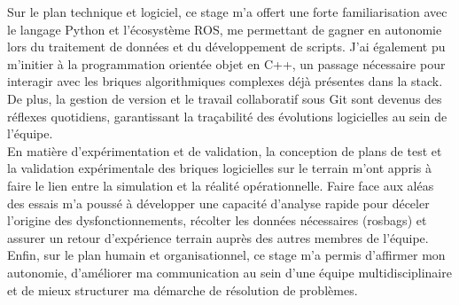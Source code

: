 Sur le plan technique et logiciel, ce stage m'a offert une forte familiarisation avec le langage Python et l'écosystème ROS, me permettant de gagner en autonomie lors du traitement de données et du développement de scripts. J'ai également pu m'initier à la programmation orientée objet en C++, un passage nécessaire pour interagir avec les briques algorithmiques complexes déjà présentes dans la stack. De plus, la gestion de version et le travail collaboratif sous Git sont devenus des réflexes quotidiens, garantissant la traçabilité des évolutions logicielles au sein de l'équipe.\\

En matière d'expérimentation et de validation, la conception de plans de test et la validation expérimentale des briques logicielles sur le terrain m'ont appris à faire le lien entre la simulation et la réalité opérationnelle. Faire face aux aléas des essais m'a poussé à développer une capacité d'analyse rapide pour déceler l'origine des dysfonctionnements, récolter les données nécessaires (rosbags) et assurer un retour d'expérience terrain auprès des autres membres de l'équipe.\\

Enfin, sur le plan humain et organisationnel, ce stage m'a permis d'affirmer mon autonomie, d'améliorer ma communication au sein d'une équipe multidisciplinaire et de mieux structurer ma démarche de résolution de problèmes.


